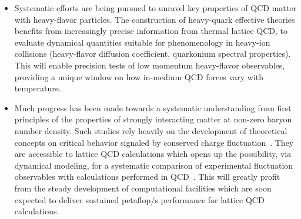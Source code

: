 \begin{itemize}
\item 
Systematic efforts are being pursued to unravel key properties of QCD matter with heavy-flavor particles. The 
construction of heavy-quark effective theories benefits from increasingly precise information from thermal lattice QCD, to 
evaluate dynamical quantities suitable for phenomenology in heavy-ion collisions (heavy-flavor diffusion coefficient, 
quarkonium spectral properties). This will enable precision tests of low momentum heavy-flavor observables, providing a 
unique window on how in-medium QCD forces vary with temperature.

\item
Much progress has been made towards a systematic understanding from first principles of the 
properties of strongly interacting matter at non-zero baryon number density. Such studies 
rely heavily on the development of theoretical concepts on critical behavior 
signaled by conserved charge fluctuation~\cite{Stephanov:1998dy,Ejiri:2005wq,Stephanov:2011pb}. 
They are accessible to lattice QCD calculations which opens up the possibility, via dynamical modeling, 
for a systematic comparison of experimental fluctuation observables with calculations performed in 
QCD~\cite{Karsch:2012wm,Bazavov:2012vg,Mukherjee:2013lsa,Borsanyi:2013hza,Borsanyi:2014ewa}. This 
will greatly profit from the steady development of computational facilities which are soon expected to deliver 
sustained petaflop/s performance for lattice QCD calculations.

\end{itemize}


